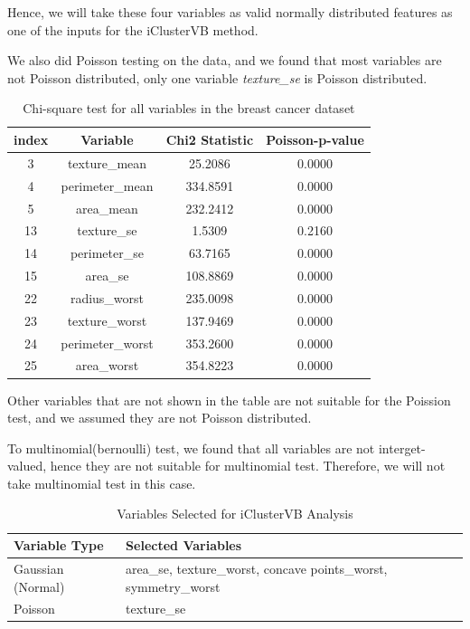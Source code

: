 Hence, we will take these four variables as valid normally distributed features as one of the inputs for the iClusterVB method.


We also did Poisson testing on the data, and we found that most variables are not Poisson distributed, 
only one variable \textit{texture\_se} is Poisson distributed.

\begin{table}[!h]
    \centering
    \caption{Chi-square test for all variables in the breast cancer dataset}
    \label{tab:chi_square_brca}
    \begin{tabular}{cccc}
    \toprule
    \textbf{index} & \textbf{Variable} & \textbf{Chi2 Statistic} & \textbf{Poisson-p-value} \\
    \midrule
    3 & texture\_mean & 25.2086 & 0.0000 \\
    4 & perimeter\_mean & 334.8591 & 0.0000 \\
    5 & area\_mean & 232.2412 & 0.0000 \\
    13 & texture\_se & 1.5309 & 0.2160 \\
    14 & perimeter\_se & 63.7165 & 0.0000 \\
    15 & area\_se & 108.8869 & 0.0000 \\
    22 & radius\_worst & 235.0098 & 0.0000 \\
    23 & texture\_worst & 137.9469 & 0.0000 \\
    24 & perimeter\_worst & 353.2600 & 0.0000 \\
    25 & area\_worst & 354.8223 & 0.0000 \\
    \bottomrule
    \end{tabular}
\end{table}

Other variables that are not shown in the table are not suitable for the Poission test, and we assumed they are not Poisson distributed.

To multinomial(bernoulli) test, we found that all variables are not interget-valued, hence they are not suitable for multinomial test.
Therefore, we will not take multinomial test in this case.


\begin{table}[!h]
    \centering
    \caption{Variables Selected for iClusterVB Analysis}
    \label{tab:variables_iclustervb}
    \begin{tabular}{ll}
    \toprule
    \textbf{Variable Type} & \textbf{Selected Variables} \\
    \midrule
    Gaussian (Normal) & area\_se, texture\_worst, concave points\_worst, symmetry\_worst \\
    Poisson & texture\_se \\
    \bottomrule
    \end{tabular}
\end{table}

